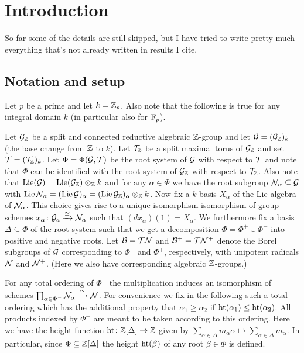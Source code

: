 
\section{Introduction}%
\label{sec:cohunigps-intro}

So far some of the details are still skipped, but I have tried to write pretty much everything that's not already written in results I cite.

\subsection{Notation and setup}

Let $p$ be a prime and let $k = \mathbb{Z}_p$. Also note that the following is true for any integral domain $k$ (in particular also for $\mathbb{F}_p$).

Let $\mathcal{G}_{\mathbb{Z}}$ be a split and connected reductive algebraic $\mathbb{Z}$-group and let $\mathcal{G} = (\mathcal{G}_{\mathbb{Z}})_{k}$ (the base change from $\mathbb{Z}$ to $k$). Let $\mathcal{T}_{\mathbb{Z}}$ be a split maximal torus of $\mathcal{G}_{\mathbb{Z}}$ and set $\mathcal{T} = (\mathcal{T}_{\mathbb{Z}})_{k}$. Let $\Phi = \Phi(\mathcal{G},\mathcal{T})$ be the root system of $\mathcal{G}$ with respect to $\mathcal{T}$ and note that $\Phi$ can be identified with the root system of $\mathcal{G}_{\mathbb{Z}}$ with respect to $\mathcal{T}_{\mathbb{Z}}$. Also note that $\operatorname{Lie}(\mathcal{G}) = \operatorname{Lie}(\mathcal{G}_{\mathbb{Z}}) \otimes_{\mathbb{Z}} k$ and for any $\alpha \in \Phi$ we have the root subgroup $\mathcal{N}_\alpha \subseteq \mathcal{G}$ with $\operatorname{Lie} \mathcal{N}_\alpha = (\operatorname{Lie} \mathcal{G})_\alpha = (\operatorname{Lie} \mathcal{G}_{\mathbb{Z}})_\alpha \otimes_{\mathbb{Z}} k$. Now fix a $k$-basis $X_\alpha$ of the Lie algebra of $\mathcal{N}_\alpha$. This choice gives rise to a unique isomorphism isomorphism of group schemes $x_\alpha \colon \mathcal{G}_a \xrightarrow{\cong} \mathcal{N}_\alpha$ such that $(dx_\alpha)(1) = X_\alpha$. We furthermore fix a basis $\Delta \subseteq \Phi$ of the root system such that we get a decomposition $\Phi = \Phi^+ \cup \Phi^-$ into positive and negative roots. Let $\mathcal{B} = \mathcal{T}\mathcal{N}$ and $\mathcal{B}^+ = \mathcal{T}\mathcal{N}^+$ denote the Borel subgroups of $\mathcal{G}$ corresponding to $\Phi^-$ and $\Phi^+$, respectively, with unipotent radicals $\mathcal{N}$ and $\mathcal{N}^+$. (Here we also have corresponding algebraic $\mathbb{Z}$-groups.)

For any total ordering of $\Phi^-$ the multiplication induces an isomorphism of schemes $\prod_{\alpha \in \Phi^-} \mathcal{N}_\alpha \xrightarrow{\cong} \mathcal{N}$. For convenience we fix in the following such a total ordering which has the additional property that $\alpha_1 \geq \alpha_2$ if $\operatorname{ht}(\alpha_1) \leq \operatorname{ht}(\alpha_2)$. All products indexed by $\Phi^-$ are meant to be taken according to this ordering. Here we have the height function $\operatorname{ht} \colon \mathbb{Z}[\Delta] \to \mathbb{Z}$ given by $\sum_{\alpha \in \Delta} m_\alpha \alpha \mapsto \sum_{\alpha \in \Delta} m_\alpha$. In particular, since $\Phi \subseteq \mathbb{Z}[\Delta]$ the height $\operatorname{ht}(\beta)$ of any root $\beta \in \Phi$ is defined.

